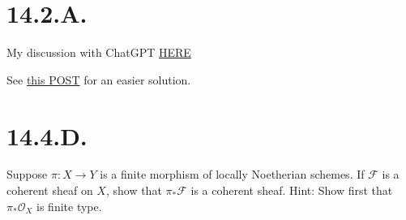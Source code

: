 \section{14.2.A.}

My discussion with ChatGPT \href{https://chatgpt.com/share/697237cb-f048-8009-b9e4-74e7c4ff0e4e}{HERE}

See \href{https://math.stackexchange.com/questions/3920320/quasi-coherent-sheaves-supset-locally-free-sheaves}{this POST} for an easier solution.

\section{14.4.D.}
\begin{exercise}
    Suppose $\pi:X\to Y$ is a finite morphism of locally Noetherian schemes. If $\mathscr F$ is a coherent sheaf on $X$, show that $\pi_{\ast}\mathscr F$ is a coherent sheaf. Hint: Show first that $\pi_{\ast}\mathscr O_X$ is finite type.
\end{exercise}

